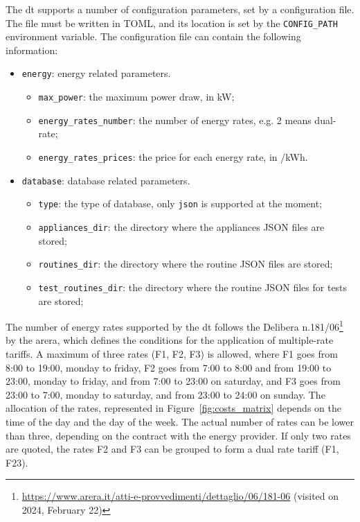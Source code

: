 The \acrshort{dt} supports a number of configuration parameters, set by a configuration file. The file must be written in TOML, and its location is set by the \texttt{CONFIG\_PATH} environment variable. The configuration file can contain the following information:
\begin{itemize}
    \item \texttt{energy}: energy related parameters.
          \begin{itemize}
              \item \texttt{max\_power}: the maximum power draw, in kW;
              \item \texttt{energy\_rates\_number}: the number of energy rates, e.g. 2 means dual-rate;
              \item \texttt{energy\_rates\_prices}: the price for each energy rate, in \texteuro/kWh.
          \end{itemize}
    \item \texttt{database}: database related parameters.
          \begin{itemize}
              \item \texttt{type}: the type of database, only \texttt{json} is supported at the moment;
              \item \texttt{appliances\_dir}: the directory where the appliances JSON files are stored;
              \item \texttt{routines\_dir}: the directory where the routine JSON files are stored;
              \item \texttt{test\_routines\_dir}: the directory where the routine JSON files for tests are stored;
          \end{itemize}
\end{itemize}

The number of energy rates supported by the \acrshort{dt} follows the Delibera n.181/06\footnote{\url{https://www.arera.it/atti-e-provvedimenti/dettaglio/06/181-06} (visited on 2024, February 22)} by the \acrfull{arera}, which defines the conditions for the application of multiple-rate tariffs. A maximum of three rates (F1, F2, F3) is allowed, where F1 goes from 8:00 to 19:00, monday to friday, F2 goes from 7:00 to 8:00 and from 19:00 to 23:00, monday to friday, and from 7:00 to 23:00 on saturday, and F3 goes from 23:00 to 7:00, monday to saturday, and from 23:00 to 24:00 on sunday. The allocation of the rates, represented in Figure~\ref{fig:costs_matrix} depends on the time of the day and the day of the week. The actual number of rates can be lower than three, depending on the contract with the energy provider. If only two rates are quoted, the rates F2 and F3 can be grouped to form a dual rate tariff (F1, F23).

